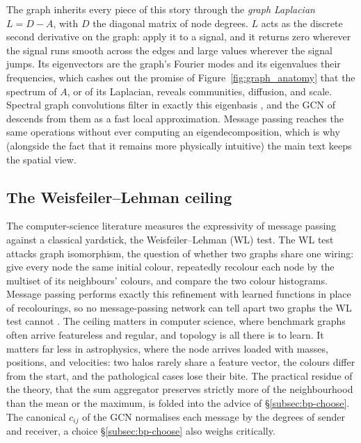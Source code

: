 The graph inherits every piece of this story through the \emph{graph Laplacian} $L = D - A$, with $D$ the diagonal matrix of node degrees. $L$ acts as the discrete second derivative on the graph: apply it to a signal, and it returns zero wherever the signal runs smooth across the edges and large values wherever the signal jumps. Its eigenvectors are the graph's Fourier modes and its eigenvalues their frequencies, which cashes out the promise of Figure~\ref{fig:graph_anatomy} that the spectrum of $A$, or of its Laplacian, reveals communities, diffusion, and scale. Spectral graph convolutions filter in exactly this eigenbasis \citep{Bruna2013_spectral_networks, Defferrard2016_chebnet}, and the GCN of \citet{Kipf2017_GCN_semisupervised} descends from them as a fast local approximation. Message passing reaches the same operations without ever computing an eigendecomposition, which is why (alongside the fact that it remains more physically intuitive) the main text keeps the spatial view.


\subsection*{The Weisfeiler--Lehman ceiling}
\label{app:sym:wl}

The computer-science literature measures the expressivity of message passing against a classical yardstick, the Weisfeiler--Lehman (WL) test. The WL test attacks graph isomorphism, the question of whether two graphs share one wiring: give every node the same initial colour, repeatedly recolour each node by the multiset of its neighbours' colours, and compare the two colour histograms. Message passing performs exactly this refinement with learned functions in place of recolourings, so no message-passing network can tell apart two graphs the WL test cannot \citep{Xu2018_GIN_expressiveness}. The ceiling matters in computer science, where benchmark graphs often arrive featureless and regular, and topology is all there is to learn. It matters far less in astrophysics, where the node arrives loaded with masses, positions, and velocities: two halos rarely share a feature vector, the colours differ from the start, and the pathological cases lose their bite. The practical residue of the theory, that the sum aggregator preserves strictly more of the neighbourhood than the mean or the maximum, is folded into the advice of \S\ref{subsec:bp-choose}. The canonical $c_{ij}$ of the GCN normalises each message by the degrees of sender and receiver, a choice \S\ref{subsec:bp-choose} also weighs critically.
